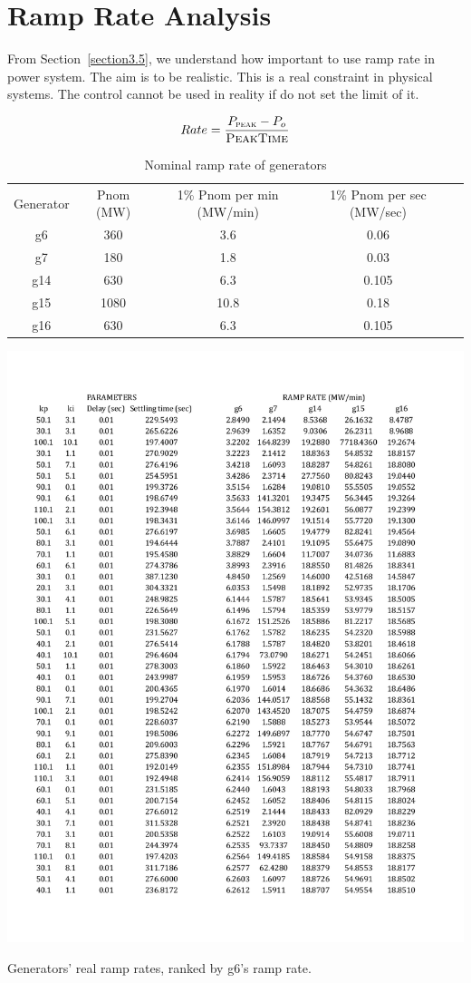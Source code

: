\section{Ramp Rate Analysis} %
\label{section4.5}

From Section~\ref{section3.5}, we understand how important to use ramp rate in power system. The aim is to be realistic. This is a real constraint in physical systems. The control cannot be used in reality if do not set the limit of it.

\begin{equation}
    Rate = \frac{P_{\textsc{peak}} - P_o}{\textsc{PeakTime}}
\end{equation}



\begin{table}[htbp]
  \centering
    \begin{tabular}{ccccc}
    Generator & Pnom (MW) & 1\% Pnom per min (MW/min) & 1\% Pnom per sec (MW/sec)\\
    g6    & 360   & 3.6   & 0.06\\
    g7    & 180   & 1.8   & 0.03\\
    g14   & 630   & 6.3   & 0.105\\
    g15   & 1080  & 10.8  & 0.18\\
    g16   & 630   & 6.3   & 0.105\\
    \end{tabular}
  \caption{Nominal ramp rate of generators}
  \label{4_5_nominal_rate}
\end{table}



\begin{table}[htbp]
\centering
\includegraphics[width = \textwidth]{figure/4_5_risk.pdf}
\caption{Generators' real ramp rates, ranked by g6's ramp rate.}
\label{4_5_risk}
\end{table}